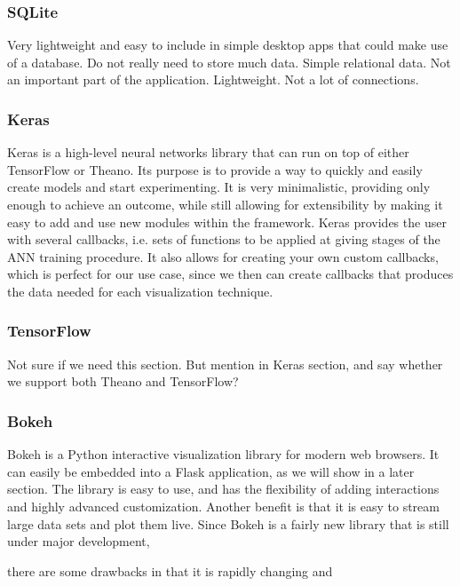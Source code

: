 \subsubsection{SQLite}

Very lightweight and easy to include in simple desktop apps that could make use of a database. Do not really need to store much data. Simple relational data. Not an important part of the application. Lightweight. Not a lot of connections.

\subsubsection{Keras}

Keras is a high-level neural networks library that can run on top of either TensorFlow or Theano. Its purpose is to provide a way to quickly and easily create models and start experimenting. It is very minimalistic, providing only enough to achieve an outcome, while still allowing for extensibility by making it easy to add and use new modules within the framework. Keras provides the user with several callbacks, i.e. sets of functions to be applied at giving stages of the ANN training procedure. It also allows for creating your own custom callbacks, which is perfect for our use case, since we then can create callbacks that produces the data needed for each visualization technique.

\subsubsection{TensorFlow}

Not sure if we need this section. But mention in Keras section, and say whether we support both Theano and TensorFlow?

\subsubsection{Bokeh}

Bokeh is a Python interactive visualization library for modern web browsers. It can easily be embedded into a Flask application, as we will show in a later section. The library is easy to use, and has the flexibility of adding interactions and highly advanced customization. Another benefit is that it is easy to stream large data sets and plot them live. Since Bokeh is a fairly new library that is still under major development,


there are some drawbacks in that it is rapidly changing and 


